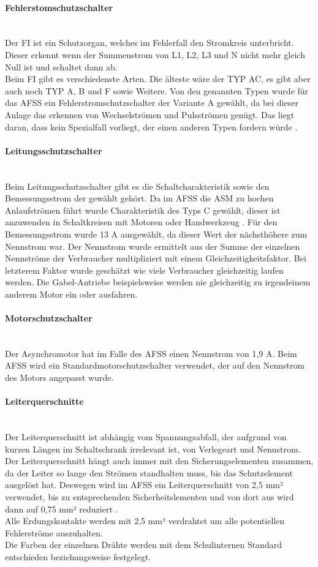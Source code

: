     \paragraph{Fehlerstomschutzschalter}\mbox{}\\
    Der FI ist ein Schutzorgan, welches im Fehlerfall den Stromkreis unterbricht. Dieser erkennt wenn der Summenstrom von L1, L2, L3 und N nicht mehr gleich Null ist und schaltet dann ab.\\
    Beim FI gibt es verschiedenste Arten. Die älteste wäre der TYP AC, es gibt aber auch noch TYP A, B und F sowie Weitere. Von den genannten Typen wurde für das AFSS ein Fehlerstromschutzschalter der Variante A gewählt, da bei dieser Anlage das erkennen von Wechselströmen und Pulsströmen genügt. Das liegt daran, dass kein Spezialfall vorliegt, der einen anderen Typen fordern würde \cite{FI-Typen}.
    \paragraph{Leitungsschutzschalter}\mbox{}\\
    Beim Leitungsschutzschalter gibt es die Schaltcharakteristik sowie den Bemessungsstrom der gewählt gehört. Da im AFSS die ASM zu hochen Anlaufströmen führt wurde Charakteristik des Typs C gewählt, dieser ist anzuwenden in Schaltkreisen mit Motoren oder Handwerkzeug \cite{SeyrRösch}. Für den Bemessungsstrom wurde 13 A ausgewählt, da dieser Wert der nächsthöhere zum Nennstrom war. Der Nennstrom wurde ermittelt aus der Summe der einzelnen Nennströme der Verbraucher multipliziert mit einem Gleichzeitigkeitsfaktor. Bei letzterem Faktor wurde geschätzt wie viele Verbraucher gleichzeitig laufen werden. Die Gabel-Antriebe beispielsweise werden nie gleichzeitig zu irgendeinem anderem Motor ein oder ausfahren. 
    \paragraph{Motorschutzschalter}\mbox{}\\
    Der Asynchromotor hat im Falle des AFSS einen Nennstrom von 1,9 A. Beim AFSS wird ein Standardmotorschutzschalter verwendet, der auf den Nennstrom des Motors angepasst wurde. 
    \paragraph{Leiterquerschnitte}\mbox{}\\
    Der Leiterquerschnitt ist abhängig vom Spannungsabfall, der aufgrund von kurzen Längen im Schaltschrank irrelevant ist, von Verlegeart und Nennstrom. Der Leiterquerschnitt hängt auch immer mit den Sicherungselementen zusammen, da der Leiter so lange den Strömen standhalten muss, bis das Schutzelement ausgelöst hat. Deswegen wird im AFSS ein Leiterquerschnitt von 2,5 mm² verwendet, bis zu entsprechenden Sicherheitslementen und von dort aus wird dann auf 0,75 mm² reduziert \cite{SeyrRösch}.\\ 
    Alle Erdungskontakte werden mit 2,5 mm² verdrahtet um alle potentiellen Fehlerströme auszuhalten.\\
    Die Farben der einzelnen Drähte werden mit dem Schulinternen Standard entschieden beziehungsweise festgelegt.
